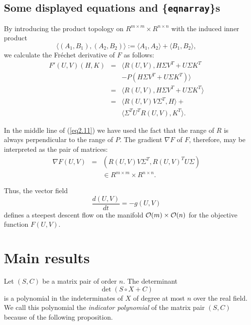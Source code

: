 \documentclass[slovensky]{svk}
\begin{document}
\subsection{Some displayed equations and \{{\tt eqnarray}\}s}
     By introducing the product topology on  $R^{m \times m} \times
R^{n \times n}$  with the induced inner product
\begin{equation}
\langle (A_{1},B_{1}), (A_{2},B_{2})\rangle := \langle A_{1},A_{2}\rangle 
+ \langle B_{1},B_{2}\rangle,\label{eq2.10}
\end{equation}
we calculate the Fr\'{e}chet derivative of  $F$  as follows:
\begin{eqnarray}
 F'(U,V)(H,K) &=& \langle R(U,V),H\Sigma V^{T} + U\Sigma K^{T}\nonumber\\
             && - P(H\Sigma V^{T} + U\Sigma K^{T})\rangle \nonumber \\
         &=& \langle R(U,V),H\Sigma V^{T} + U\Sigma K^{T}\rangle\nonumber \\
&=& \langle R(U,V)V\Sigma^{T},H\rangle + \nonumber\\
  &&    \langle \Sigma^{T}U^{T}R(U,V),K^{T}\rangle.    \label{eq2.11}
\end{eqnarray}

In the middle line of (\ref{eq2.11}) we have used the fact that the range of
$R$ is always perpendicular to the range of $P$.  The gradient $\nabla F$  of
$F$, therefore,  may be interpreted as the
pair of matrices:
\begin{eqnarray}
 \nabla F(U,V) &=& (R(U,V)V\Sigma^{T},R(U,V)^{T}U\Sigma )\nonumber\\
 && \in R^{m \times m} \times R^{n \times n}.   \label{eq2.12}
\end{eqnarray}

Thus, the vector field
\begin{equation}
\frac{d(U,V)}{dt} = -g(U,V) 	\label{eq2.15}
\end{equation}
defines a steepest descent flow on the manifold  ${\cal O} (m) \times
{\cal O} (n)$ for the objective function  $F(U,V)$.

 
\section{Main results} 
 
Let $(S,C)$ be a matrix pair of order $n$.  The determinant
\[\det (S\circ X+C)\] 
is a polynomial in the indeterminates of $X$ of degree at
most $n$ over the real field. We call this polynomial the
{\em indicator polynomial} of the matrix pair $(S,C)$
because of the following proposition.
 
\end{document}
